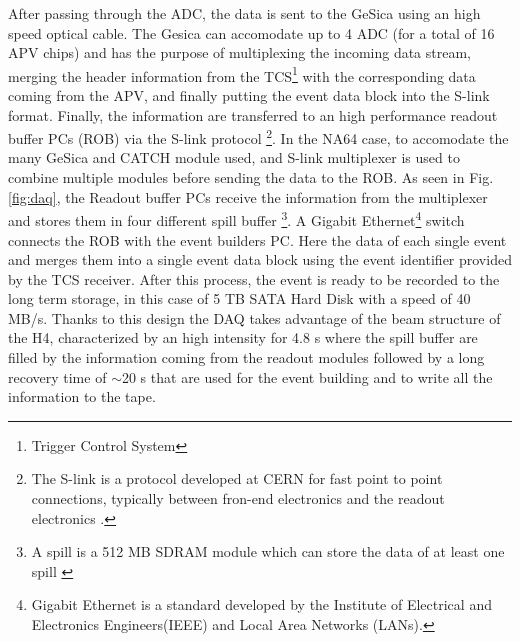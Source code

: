 After passing through the ADC, the data is sent to the GeSica using an high speed optical cable. The Gesica can accomodate up to 4 ADC (for a total of 16 APV chips) and has the purpose of multiplexing the incoming data stream, merging the header information from the TCS\footnote{Trigger Control System} with the corresponding data coming from the APV, and finally putting the event data block into the S-link format. Finally, the information are transferred to an high performance readout buffer PCs (ROB) via the S-link protocol \footnote{The S-link is a protocol developed at CERN for fast point to point connections, typically between fron-end electronics and the readout electronics \cite{s-link}.}. In the NA64 case, to accomodate the many GeSica and CATCH module used, and S-link multiplexer is used to combine multiple modules before sending the data to the ROB. As seen in Fig.\ref{fig:daq}, the Readout buffer PCs receive the information from the multiplexer and stores them in four different spill buffer \footnote{A spill is a 512 MB SDRAM module which can store the data of at least one spill \cite{COMPASS-daq}}. A Gigabit Ethernet\footnote{Gigabit Ethernet is a standard developed by the Institute of Electrical and Electronics Engineers(IEEE) and Local Area Networks (LANs).} switch connects the ROB with the event builders PC. Here the data of each single event and merges them into a single event data block using the event identifier provided by the TCS receiver. After this process, the event is ready to be recorded to the long term storage, in this case of 5 TB SATA Hard Disk with a speed of 40 MB/s. Thanks to this design the DAQ takes advantage of the beam structure of the H4, characterized by an high intensity for 4.8 \si{\second} where the spill buffer are filled by the information coming from the readout modules followed by a long recovery time of $\sim$20 \si{\second} that are used for the event building and to write all the information to the tape.

